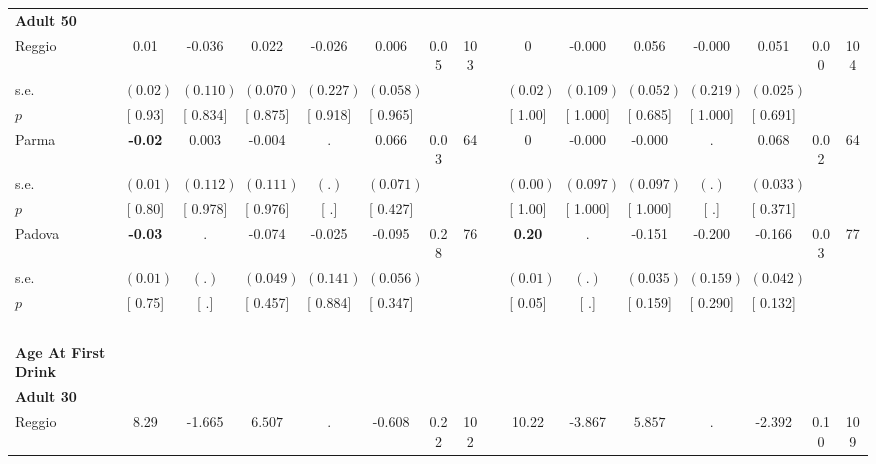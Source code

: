 \begin{longtable}{L{8em} c c c c c c c p{1em} c c c c c c c}
\quad \quad \textbf{Adult 50} & & & & & & & & & & & & & & & \\* 
\quad \quad \quad Reggio& 0.01 &    -0.036 &     0.022 &    -0.026 &     0.006 &      0.05 &       103 & & 0 &    -0.000 &     0.056 &    -0.000 &     0.051 &      0.00 &       104  \\*
\quad \quad \quad \quad s.e.& $ (     0.02)$ & $ (    0.110)$ & $ (    0.070)$ & $ (    0.227)$ & $ (    0.058)$ & & & & $ (     0.02)$ & $ (    0.109)$ & $ (    0.052)$ & $ (    0.219)$ & $ (    0.025)$ & &  \\*
\quad \quad \quad \quad $ p$ & [     0.93] & [    0.834] & [    0.875] & [    0.918] & [    0.965] & & & & [     1.00] & [    1.000] & [    0.685] & [    1.000] & [    0.691] & &  \\[1em]
\quad \quad \quad Parma& \textbf{    -0.02} &     0.003 &    -0.004 &         . &     0.066 &      0.03 &        64 & & 0 &    -0.000 &    -0.000 &         . &     0.068 &      0.02 &        64  \\*
\quad \quad \quad \quad s.e.& $ (     0.01)$ & $ (    0.112)$ & $ (    0.111)$ & $ (        .)$ & $ (    0.071)$ & & & & $ (     0.00)$ & $ (    0.097)$ & $ (    0.097)$ & $ (        .)$ & $ (    0.033)$ & &  \\*
\quad \quad \quad \quad $ p$ & [     0.80] & [    0.978] & [    0.976] & [        .] & [    0.427] & & & & [     1.00] & [    1.000] & [    1.000] & [        .] & [    0.371] & &  \\[1em]
\quad \quad \quad Padova& \textbf{    -0.03} &         . &    -0.074 &    -0.025 &    -0.095 &      0.28 &        76 & & \textbf{     0.20} &         . &    -0.151 &    -0.200 &    -0.166 &      0.03 &        77  \\*
\quad \quad \quad \quad s.e.& $ (     0.01)$ & $ (        .)$ & $ (    0.049)$ & $ (    0.141)$ & $ (    0.056)$ & & & & $ (     0.01)$ & $ (        .)$ & $ (    0.035)$ & $ (    0.159)$ & $ (    0.042)$ & &  \\*
\quad \quad \quad \quad $ p$ & [     0.75] & [        .] & [    0.457] & [    0.884] & [    0.347] & & & & [     0.05] & [        .] & [    0.159] & [    0.290] & [    0.132] & &  \\[1em]
~\\[1em]
\textbf{Age At First Drink} \\*
\quad \quad \textbf{Adult 30} & & & & & & & & & & & & & & & \\* 
\quad \quad \quad Reggio& 8.29 &    -1.665 & $ \mathbf{    6.507}$ &         . &    -0.608 &      0.22 &       102 & & 10.22 &    -3.867 & $ \mathbf{    5.857}$ &         . &    -2.392 &      0.10 &       109  \\*

\end{longtable}
